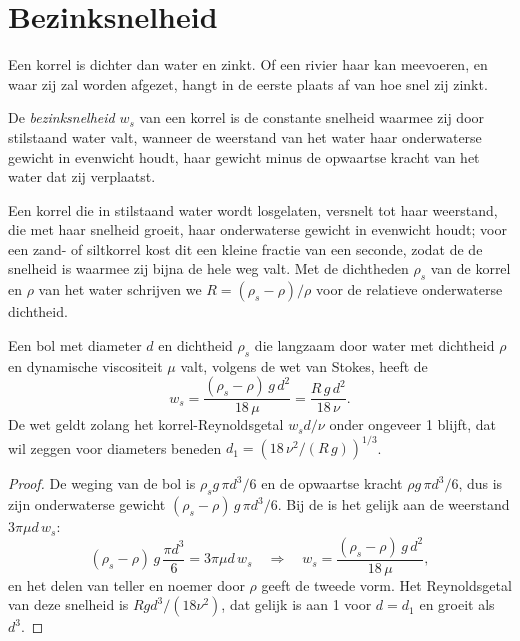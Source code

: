 \section{Bezinksnelheid}\label{sec:b1:erosion-transport:settling}

Een korrel is dichter dan water en zinkt. Of een rivier haar kan meevoeren, en waar zij zal worden afgezet, hangt in de eerste plaats af van hoe snel zij zinkt.

\begin{definition}[Bezinksnelheid]\label{def:b1:erosion-transport:settling}
De \emph{bezinksnelheid} $w_s$ van een korrel is de constante snelheid waarmee zij door stilstaand water valt, wanneer de weerstand van het water haar onderwaterse gewicht in evenwicht houdt, haar gewicht minus de opwaartse kracht van het water dat zij verplaatst.
\end{definition}

Een korrel die in stilstaand water wordt losgelaten, versnelt tot haar weerstand, die met haar snelheid groeit, haar onderwaterse gewicht in evenwicht houdt; voor een zand- of siltkorrel kost dit een kleine fractie van een seconde, zodat de  de snelheid is waarmee zij bijna de hele weg valt. Met de dichtheden $\rho_s$ van de korrel en $\rho$ van het water schrijven we $R = (\rho_s - \rho)/\rho$ voor de relatieve onderwaterse dichtheid.

\begin{proposition}\label{prop:b1:erosion-transport:stokes}
Een bol met diameter $d$ en dichtheid $\rho_s$ die langzaam door water met dichtheid $\rho$ en dynamische viscositeit $\mu$ valt, volgens de wet van Stokes, heeft de 
\[
  w_s = \frac{(\rho_s - \rho)\,g\,d^2}{18\,\mu} = \frac{R\,g\,d^2}{18\,\nu}.
\]
De wet geldt zolang het korrel-Reynoldsgetal $w_s d/\nu$ onder ongeveer 1 blijft, dat wil zeggen voor diameters beneden $d_1 = \left(18\,\nu^2/(R\,g)\right)^{1/3}$.
\end{proposition}

\begin{proof}
De weging van de bol is $\rho_s g\,\pi d^3/6$ en de opwaartse kracht $\rho g\,\pi d^3/6$, dus is zijn onderwaterse gewicht $(\rho_s - \rho)\,g\,\pi d^3/6$. Bij de  is het gelijk aan de weerstand $3\pi\mu d\,w_s$:
\[
  (\rho_s - \rho)\,g\,\frac{\pi d^3}{6} = 3\pi\mu d\,w_s
  \quad\Longrightarrow\quad
  w_s = \frac{(\rho_s - \rho)\,g\,d^2}{18\,\mu},
\]
en het delen van teller en noemer door $\rho$ geeft de tweede vorm.
Het Reynoldsgetal van deze snelheid is $R g d^3/(18\nu^2)$, dat gelijk is aan 1 voor $d = d_1$ en groeit als $d^3$.
\end{proof}

